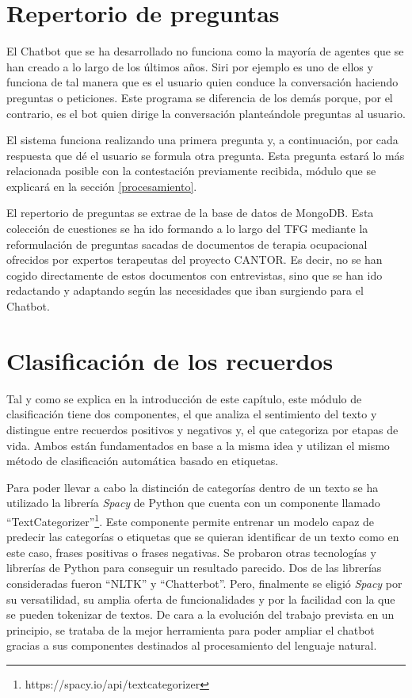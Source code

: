\section {Repertorio de preguntas} \label{rep_preguntas}

El Chatbot que se ha desarrollado no funciona como la mayoría de agentes que se han creado a lo largo de los últimos años. Siri por ejemplo es uno de ellos y funciona de tal manera que es el usuario quien conduce la conversación haciendo preguntas o peticiones. Este programa se diferencia de los demás porque, por el contrario, es el bot quien dirige la conversación planteándole preguntas al usuario. 

El sistema funciona realizando una primera pregunta y, a continuación, por cada respuesta que dé el usuario se formula otra pregunta. Esta pregunta estará lo más relacionada posible con la contestación previamente recibida, módulo que se explicará en la sección \ref{procesamiento}. 

El repertorio de preguntas se extrae de la base de datos de MongoDB. Esta colección de cuestiones se ha ido formando a lo largo del TFG mediante la reformulación de preguntas sacadas de documentos de terapia ocupacional ofrecidos por expertos terapeutas del proyecto CANTOR. Es decir, no se han cogido directamente de estos documentos con entrevistas, sino que se han ido redactando y adaptando según las necesidades que iban surgiendo para el Chatbot. 

\section{Clasificación de los recuerdos} \label{clasificacion_rec}

Tal y como se explica en la introducción de este capítulo, este módulo de clasificación tiene dos componentes, el que analiza el sentimiento del texto y distingue entre recuerdos positivos y negativos y, el que categoriza por etapas de vida. Ambos están fundamentados en base a la misma idea y utilizan el mismo método de clasificación automática basado en etiquetas.

Para poder llevar a cabo la distinción de categorías dentro de un texto se ha utilizado la librería \textit{Spacy} de Python que cuenta con un componente llamado ``TextCategorizer''\footnote{https://spacy.io/api/textcategorizer}. Este componente permite entrenar un modelo capaz de predecir las categorías o etiquetas que se quieran identificar de un texto como en este caso, frases positivas o frases negativas. Se probaron otras tecnologías y librerías de Python para conseguir un resultado parecido. Dos de las librerías consideradas fueron ``NLTK'' y ``Chatterbot''. Pero, finalmente se eligió \textit{Spacy} por su versatilidad, su amplia oferta de funcionalidades y por la facilidad con la que se pueden tokenizar de textos. De cara a la evolución del trabajo prevista en un principio, se trataba de la mejor herramienta para poder ampliar el chatbot gracias a sus componentes destinados al procesamiento del lenguaje natural. 


